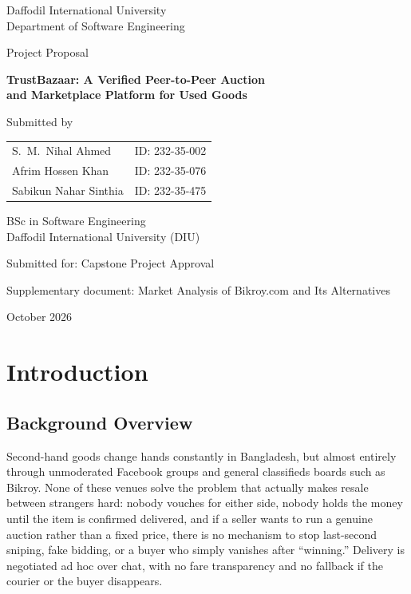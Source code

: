 \documentclass[11pt,a4paper]{article}
\begin{document}
\begin{titlepage}
\centering
{\large Daffodil International University\\ Department of Software Engineering\par}
\vspace{3.2cm}
{\Large Project Proposal\par}
\vspace{0.6cm}
{\LARGE\bfseries TrustBazaar: A Verified Peer-to-Peer Auction\\[4pt]
and Marketplace Platform for Used Goods\par}
\vspace{2.8cm}
{\large Submitted by\par}
\vspace{0.6cm}
\begin{tabular}{ll}
S.\ M.\ Nihal Ahmed & ID: 232-35-002\\
Afrim Hossen Khan & ID: 232-35-076\\
Sabikun Nahar Sinthia & ID: 232-35-475\\
\end{tabular}
\vspace{1.4cm}

{BSc in Software Engineering\\ Daffodil International University (DIU)\par}
\vspace{0.8cm}
{Submitted for: Capstone Project Approval\par}
\vspace{0.4cm}
{\small Supplementary document: Market Analysis of Bikroy.com and Its Alternatives\par}
\vfill
{\large October 2026\par}
\end{titlepage}

\tableofcontents
\newpage

\section{Introduction}

\subsection{Background Overview}

Second-hand goods change hands constantly in Bangladesh, but almost entirely through unmoderated
Facebook groups and general classifieds boards such as Bikroy. None of these venues solve the
problem that actually makes resale between strangers hard: nobody vouches for either side, nobody
holds the money until the item is confirmed delivered, and if a seller wants to run a genuine
auction rather than a fixed price, there is no mechanism to stop last-second sniping, fake bidding,
or a buyer who simply vanishes after ``winning.'' Delivery is negotiated ad hoc over chat, with no
fare transparency and no fallback if the courier or the buyer disappears.
\end{document}
